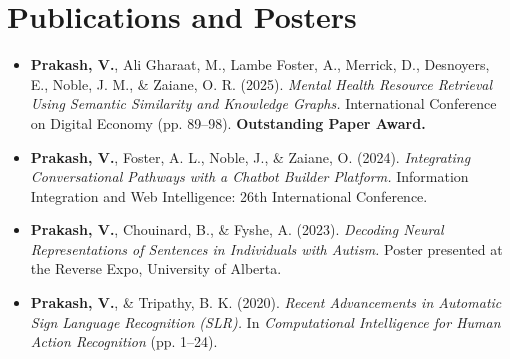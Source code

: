\documentclass[letterpaper,11pt]{article}
\newcommand{\resumeItem}[1]{
  \item\small{
    {#1 \vspace{-2pt}}
  }
}
\newcommand{\resumeItemListStart}{\begin{itemize}}
\newcommand{\resumeItemListEnd}{\end{itemize}\vspace{-5pt}}
\begin{document}
\section{Publications and Posters}
\begin{justify}
\resumeItemListStart

\resumeItem{
{\bf Prakash, V.}, Ali Gharaat, M., Lambe Foster, A., Merrick, D., Desnoyers, E., Noble, J. M., \& Zaiane, O. R. (2025).
\textit{Mental Health Resource Retrieval Using Semantic Similarity and Knowledge Graphs.}
International Conference on Digital Economy (pp. 89--98).
{\bf Outstanding Paper Award.}
}
\resumeItem{
{\bf Prakash, V.}, Foster, A. L., Noble, J., \& Zaiane, O. (2024).
\textit{Integrating Conversational Pathways with a Chatbot Builder Platform.}
Information Integration and Web Intelligence: 26th International Conference.
}
\resumeItem{
{\bf Prakash, V.}, Chouinard, B., \& Fyshe, A. (2023).
\textit{Decoding Neural Representations of Sentences in Individuals with Autism.}
Poster presented at the Reverse Expo, University of Alberta.
}
\resumeItem{
{\bf Prakash, V.}, \& Tripathy, B. K. (2020).
\textit{Recent Advancements in Automatic Sign Language Recognition (SLR).}
In \textit{Computational Intelligence for Human Action Recognition} (pp. 1--24).
}

\resumeItemListEnd

\end{justify} 

\end{document}
